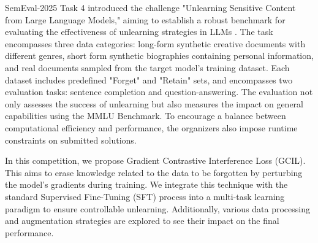 \documentclass[11pt]{article}
\begin{document}

SemEval-2025 Task 4 introduced the challenge "Unlearning Sensitive Content from Large Language Models," aiming to establish a robust benchmark for evaluating the effectiveness of unlearning strategies in LLMs \cite{ramakrishna2025lumellmunlearningmultitask}. The task encompasses three data categories: long-form synthetic creative documents with different genres, short form synthetic biographies containing personal information, and real documents sampled from the target model’s training dataset. Each dataset includes predefined "Forget" and "Retain" sets, and encompasses two evaluation tasks: sentence completion and question-answering. The evaluation not only assesses the success of unlearning but also measures the impact on general capabilities using the MMLU Benchmark. To encourage a balance between computational efficiency and performance, the organizers also impose runtime constraints on submitted solutions.


In this competition, we propose Gradient Contrastive Interference Loss (GCIL). This aims to erase knowledge related to the data to be forgotten by perturbing the model's gradients during training. We integrate this technique with the standard Supervised Fine-Tuning (SFT) process into a multi-task learning paradigm to ensure controllable unlearning. Additionally, various data processing and augmentation strategies \cite{choi2024snap, shi2024ulmr} are explored to see their impact on the final performance.
\end{document}
